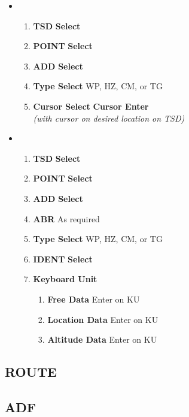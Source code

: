 \documentclass[fontHelvetica]{TechCheck}
\begin{document}
	\begin{itemize}[leftmargin=0.1\linewidth,rightmargin=0.1\linewidth]
		\item {}
		\begin{enumerate}
			\item \textbf{TSD} \dotfill \textbf{Select}
			\item \textbf{POINT} \dotfill \textbf{Select}
			\item \textbf{ADD} \dotfill \textbf{Select}
			\item \textbf{Type Select} \dotfill WP, HZ, CM, or TG 
			\item \textbf{Cursor Select} \dotfill \textbf{Cursor Enter} \\
			\hfill \emph{(with cursor on desired location on TSD)}
		\end{enumerate}
		\item {}
		\begin{enumerate}
			\item \textbf{TSD} \dotfill \textbf{Select}
			\item \textbf{POINT} \dotfill \textbf{Select}
			\item \textbf{ADD} \dotfill \textbf{Select}
			\item \textbf{ABR} \dotfill As required
			\item \textbf{Type Select} \dotfill WP, HZ, CM, or TG 
			\item \textbf{IDENT} \dotfill \textbf{Select}
			\item \textbf{Keyboard Unit}
			\begin{enumerate}
				\item \textbf{Free Data} \dotfill Enter on KU
				\item \textbf{Location Data} \dotfill Enter on KU
				\item \textbf{Altitude Data} \dotfill Enter on KU
			\end{enumerate}
		\end{enumerate}
	\end{itemize}
	
	\subsection{ROUTE}

	\subsection{ADF}

	\cleardoublepage
\end{document}
